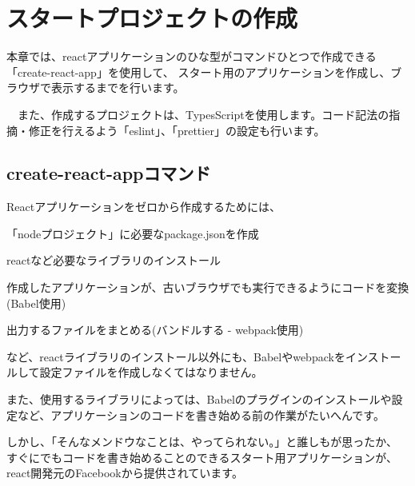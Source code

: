 \chapter{スタートプロジェクトの作成}
\label{chap:02-create-react-app}
\begin{starterabstract}
  本章では、reactアプリケーションのひな型がコマンドひとつで作成できる「create{-}react{-}app」を使用して、
スタート用のアプリケーションを作成し、ブラウザで表示するまでを行います。

　また、作成するプロジェクトは、TypesScriptを使用します。コード記法の指摘・修正を行えるよう「eslint」、「prettier」の設定も行います。

\end{starterabstract}

\section{create{-}react{-}appコマンド}
\keeplastskip{
  \label{sec:2-1}
  \label{sec-01command}
  \par\nobreak
}

Reactアプリケーションをゼロから作成するためには、\\[0pt]

\begin{starteritemize}
\item 「nodeプロジェクト」に必要なpackage.jsonを作成
\item reactなど必要なライブラリのインストール
\item 作成したアプリケーションが、古いブラウザでも実行できるようにコードを変換(Babel使用)
\item 出力するファイルをまとめる(バンドルする {-} webpack使用)
\end{starteritemize}

\vspace*{\baselineskip}

など、reactライブラリのインストール以外にも、Babelやwebpackをインストールして設定ファイルを作成しなくてはなりません。

\vspace*{\baselineskip}

また、使用するライブラリによっては、Babelのプラグインのインストールや設定など、アプリケーションのコードを書き始める前の作業がたいへんです。

\vspace*{\baselineskip}

しかし、「そんなメンドウなことは、やってられない。」と誰しもが思ったか、
すぐにでもコードを書き始めることのできるスタート用アプリケーションが、react開発元のFacebookから提供されています。

